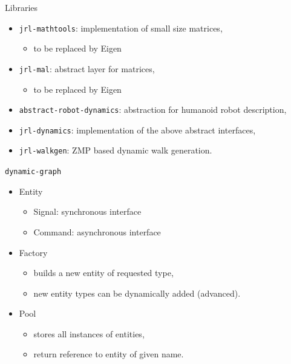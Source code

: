 \begin {frame} {Libraries}
  \begin{itemize}
  \item \texttt {jrl-mathtools}: implementation of small size matrices,
    \begin{itemize}
    \item to be replaced by Eigen
    \end{itemize}
    \pause
  \item \texttt {jrl-mal}: abstract layer for matrices,
    \begin{itemize}
    \item to be replaced by Eigen
    \end{itemize}
    \pause
  \item \texttt {abstract-robot-dynamics}: abstraction for humanoid robot description,
    \pause
  \item \texttt {jrl-dynamics}: implementation of the above abstract interfaces,
    \pause
  \item \texttt {jrl-walkgen}: ZMP based dynamic walk generation.
\end{itemize}
\end{frame}

%
%
\begin {frame} {\texttt{dynamic-graph}}
  \begin {itemize}
  \item Entity
    \begin{itemize}
    \item Signal: synchronous interface
    \item Command: asynchronous interface
    \end{itemize}
    \pause
  \item Factory
    \begin{itemize}
    \item builds a new entity of requested type,
    \item new entity types can be dynamically added (advanced).
    \end{itemize}
    \pause
  \item Pool
    \begin{itemize}
      \item stores all instances of entities,
      \item return reference to entity of given name.
    \end{itemize}
  \end{itemize}
\end {frame}

